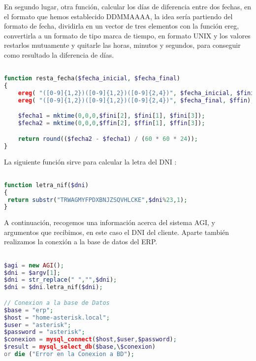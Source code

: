 En segundo lugar, otra función, calcular los días de diferencia entre dos fechas, en el formato que hemos establecido DDMMAAAA, la idea sería partiendo del formato de fecha, dividirla en un vector de tres elementos con la función ereg, convertirla a un formato de tipo marca de tiempo, en formato UNIX y los valores restarlos mutuamente y quitarle las horas, minutos y segundos, para conseguir como resultado la diferencia de días.

\begin{lstlisting}[language=php,title={/var/lib/asterisk/agi-bin/fingarantia.php}]

function resta_fecha($fecha_inicial, $fecha_final)
{
    ereg( "([0-9]{1,2})([0-9]{1,2})([0-9]{2,4})", $fecha_inicial, $fini);
    ereg( "([0-9]{1,2})([0-9]{1,2})([0-9]{2,4})", $fecha_final, $ffin);

    $fecha1 = mktime(0,0,0,$fini[2], $fini[1], $fini[3]);
    $fecha2 = mktime(0,0,0,$ffin[2], $ffin[1], $ffin[3]);

    return round(($fecha2 - $fecha1) / (60 * 60 * 24));
}

\end{lstlisting}

La siguiente función sirve para calcular la letra del DNI \cite{website:algoritmodni}:

\begin{lstlisting}[language=php,title={/var/lib/asterisk/agi-bin/fingarantia.php}]

function letra_nif($dni)
{
 return substr("TRWAGMYFPDXBNJZSQVHLCKE",$dni%23,1);
}

\end{lstlisting}

A continuación, recogemos una información acerca del sistema AGI, y argumentos que recibimos, en este caso el DNI del cliente. Aparte también realizamos la conexión a la base de datos del ERP.

\begin{lstlisting}[language=php,title={/var/lib/asterisk/agi-bin/fingarantia.php}]

$agi = new AGI();
$dni = $argv[1];
$dni = str_replace(" ","",$dni);
$dni = $dni.letra_nif($dni);

// Conexion a la base de Datos
$base = "erp";
$host = "home-asterisk.local";
$user = "asterisk";
$password = "asterisk";
$conexion = mysql_connect($host,$user,$password);
$result = mysql_select_db($base,\$conexion) 
or die ("Error en la Conexion a BD");

\end{lstlisting}

